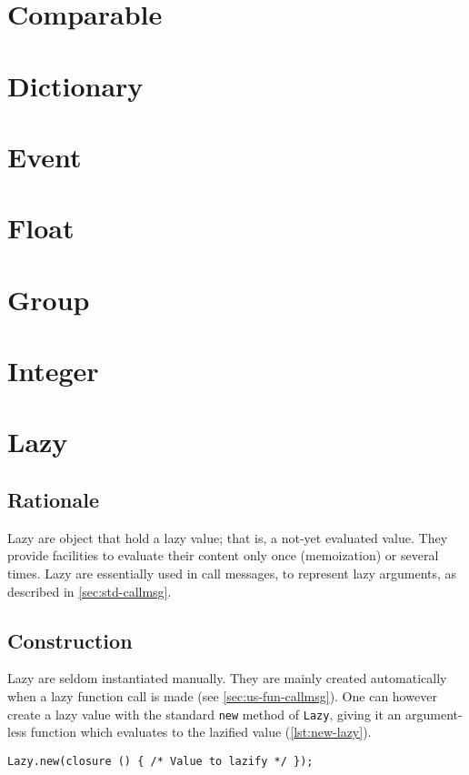 \documentclass[openright,twoside,12pt]{report}
\begin{document}
\section{Comparable}
\label{sec:std-comparable}
\section{Dictionary}
\section{Event}

\section{Float}


\section{Group}
\section{Integer}
\section{Lazy}

\subsection{Rationale}

Lazy are object that hold a lazy value; that is, a not-yet evaluated
value. They provide facilities to evaluate their content only once
(memoization) or several times. Lazy are essentially used in call
messages, to represent lazy arguments, as described in
\autoref{sec:std-callmsg}.

\subsection{Construction}

Lazy are seldom instantiated manually. They are mainly created
automatically when a lazy function call is made (see
\autoref{sec:us-fun-callmsg}). One can however create a lazy value with the
standard \lstinline|new| method of \lstinline|Lazy|, giving it an
argument-less function which evaluates to the lazified value
(\autoref{lst:new-lazy}).

\begin{lstlisting}[caption=Creating a lazy value, label=lst:new-lazy,
  float=\floatpos]
  Lazy.new(closure () { /* Value to lazify */ });
\end{lstlisting}
\end{document}
